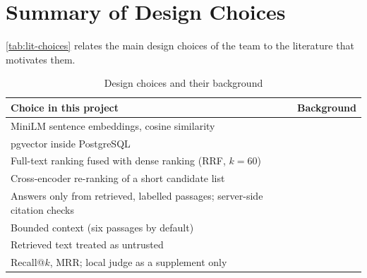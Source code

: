 \section{Summary of Design Choices}

\autoref{tab:lit-choices} relates the main design choices of the team to the literature that motivates them.

\begin{table}[htbp]
  \centering
  \caption{Design choices and their background}\label{tab:lit-choices}
  \begin{tabularx}{\textwidth}{@{}Lp{4.6cm}@{}}
    \toprule
    \textbf{Choice in this project} & \textbf{Background} \\
    \midrule
    MiniLM sentence embeddings, cosine similarity & \cite{reimers2019sbert,wang2020minilm,karpukhin2020dpr} \\
    pgvector inside PostgreSQL & \cite{pgvector,malkov2020hnsw} \\
    Full-text ranking fused with dense ranking (RRF, $k=60$) & \cite{robertson2009bm25,cormack2009rrf,pgtextsearch} \\
    Cross-encoder re-ranking of a short candidate list & \cite{nogueira2019rerank} \\
    Answers only from retrieved, labelled passages; server-side citation checks & \cite{lewis2020rag,ji2023hallucination} \\
    Bounded context (six passages by default) & \cite{liu2024lostmiddle} \\
    Retrieved text treated as untrusted & \cite{greshake2023injection,owaspllm} \\
    Recall@$k$, MRR; local judge as a supplement only & \cite{manning2008ir,voorhees1999trec8qa,zheng2023judge} \\
    \bottomrule
  \end{tabularx}
\end{table}

